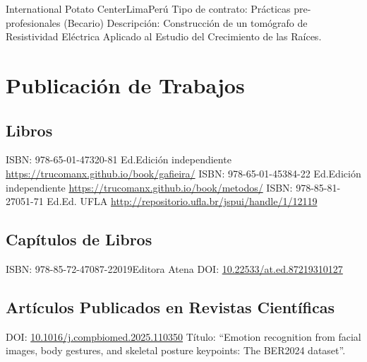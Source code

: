 \documentclass[11pt,a4paper,sans]{moderncv} %
\newcommand{\doiurl}[1]{\href{https://doi.org/#1}{#1}}
\begin{document}
		      {International Potato Center}{Lima}{Perú}
		      {Tipo de contrato: Prácticas pre-profesionales (Becario)\newline{}
		      Descripción: Construcción de un tomógrafo de Resistividad Eléctrica Aplicado al Estudio del Crecimiento de las Raíces.}


\section{Publicación de Trabajos}
\subsection{Libros}
	      {ISBN: 978-65-01-47320-8}{1 Ed.}{Edición independiente}
	      {\url{https://trucomanx.github.io/book/gafieira/}}
	      {ISBN: 978-65-01-45384-2}{2 Ed.}{Edición independiente}
	      {\url{https://trucomanx.github.io/book/metodos/}}
	      {ISBN: 978-85-81-27051-7}{1 Ed.}{Ed. UFLA}
	      {\url{http://repositorio.ufla.br/jspui/handle/1/12119}}

\subsection{Capítulos de Libros}
	      {ISBN: 978-85-72-47087-2}{2019}{Editora Atena}
	      {DOI: \doiurl{10.22533/at.ed.87219310127}}

\subsection{Artículos Publicados en Revistas Científicas}

	      {DOI: \doiurl{10.1016/j.compbiomed.2025.110350} }{}{}
	      {Título: ``Emotion recognition from facial images, body gestures, and skeletal posture keypoints: The BER2024 dataset''.}
	      
\end{document}
